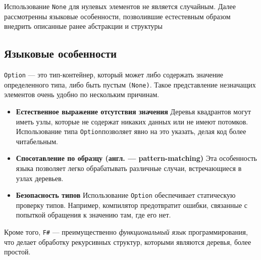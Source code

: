 Использование \texttt{None} для нулевых элементов не является случайным. Далее рассмотренны языковые особенности, позволившие естестевным образом внедрить описанные ранее абстракции и структуры

\subsection{Языковые особенности \fsharp}
\texttt{Option} --- это тип-контейнер, который может либо содержать значение определенного типа, либо быть пустым \texttt{(None)}. Такое представление незначащих элементов очень удобно по нескольким причинам.
\begin{itemize}
\item{\textbf{Естественное выражение отсутствия значения}} \newline
Деревья квадрантов могут иметь узлы, которые не содержат никаких данных или не имеют потомков. Использование типа \texttt{Option}позволяет явно на это указать, делая код более читабельным.
\item{\textbf{Спосотавление по образцу (англ. --- pattern-matching)}} \newline
Эта особенность языка позволяет легко обрабатывать различные случаи, встречающиеся в узлах деревьев.
\item{\textbf{Безопасность типов}} \newline
Использование \texttt{Option} обеспечивает статическую проверку типов. Например, компилятор предотвратит ошибки, связанные с попыткой обращения к значению там, где его нет.
\end{itemize}

Кроме того, \texttt{F\#} --- преимущественно \textit{функциональный язык} программирования, что делает обработку рекурсивных структур, которыми являются деревья, более простой.